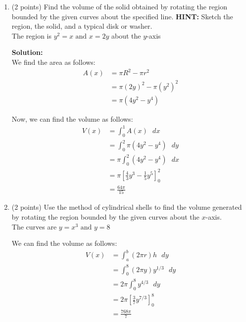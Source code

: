 \documentclass[paper=a4, fontsize=11pt]{scrartcl} %
\numberwithin{equation}{section} %
\numberwithin{figure}{section} %
\numberwithin{table}{section} %
\begin{document}
\begin{enumerate}
\setlength{\itemsep}{0.45in}
\item (2 points) Find the volume of the solid obtained by rotating the region bounded by the given curves about the specified line.  \textbf{HINT:} Sketch the region, the solid, and a typical disk or washer.\\

The region is $\displaystyle y^2=x \text{ and } x=2y$ about the $y$-axis

\noindent\textbf{Solution:}\\
We find the area as follows:
\begin{align*}
A(x) &= \pi R^2 - \pi r^2\\
&= \pi (2y)^2 - \pi (y^2)^2\\
&= \pi \left( 4y^2 - y^4 \right)
\end{align*}

Now, we can find the volume as follows:
\begin{align*}
V(x) &= \int_0^1 A(x) \text{  } dx \\
&= \int_0^2 \pi \left( 4y^2 - y^4 \right) \text{  } dy \\
&=  \pi  \int_0^2  \left( 4y^2 - y^4 \right) \text{  } dx \\
&= \pi \left[ \frac{4}{3}y^3 - \frac{1}{5}y^5 \right]_0^2\\
&= \boxed{\frac{64 \pi}{15}}
\end{align*}

\item (2 points) Use the method of cylindrical shells to find the volume generated by rotating the region bounded by the given curves about the $x$-axis.\\

The curves are $\displaystyle y=x^3 \text{ and } y=8$

We can find the volume as follows:
\begin{align*}
V(x) &= \int_a^b (2 \pi r) h \text{  } dy \\
&= \int_0^8 (2 \pi y) y^{1/3} \text{  } dy \\
&= 2 \pi \int_0^8 y^{4/3} \text{  } dy \\
&= 2 \pi \left[ \frac{3}{7} y^{7/3}\right]_0^8 \\
&= \boxed{\frac{768 \pi}{7}}
\end{align*}




\end{enumerate}
\end{document}
